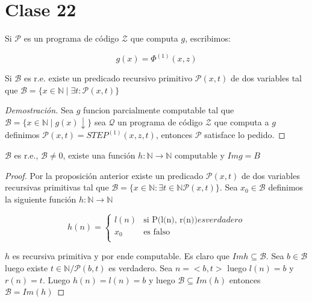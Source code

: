\section{Clase 22}

\begin{definition}
Si $\mathcal{P}$ es un programa de c\'odigo $\mathcal{Z}$ que computa $g$, escribimos:

\[
g(x) = \Phi^{(1)}(x, z)
\]
\end{definition}

\begin{proposition}
Si $\mathcal{B}$ es r.e. existe un predicado recursivo primitivo $\mathcal{P}(x, t)$ de dos variables tal que $\mathcal{B} = \{ x \in \mathbb{N} \mid \exists t \colon \mathcal{P}(x, t)\}$
\end{proposition}

\begin{proof}[Demostraci\'on]
Sea $g$ funcion parcialmente computable tal que $\mathcal{B} = \{ x \in \mathbb{N} \mid g(x) \downarrow \}$ sea $\mathcal{Q}$ un programa de c\'odigo $\mathcal{Z}$ que computa a $g$ definimos $\mathcal{P}(x, t) = STEP^{(1)}(x, z, t)$, entonces $\mathcal{P}$ satisface lo pedido.
\end{proof}

\begin{colorario}
$\mathcal{B}$ es r.e., $\mathcal{B} \neq 0$, existe una funci\'on $h \colon \mathbb{N} \to \mathbb{N}$ computable y $Img = B$
\end{colorario}

\begin{proof}
Por la proposici\'on anterior existe un predicado $\mathcal{P}(x, t)$ de dos variables recursivas primitivas tal que $\mathcal{B} = \{ x \in \mathbb{N} \colon \exists t \in \mathbb{N} \mathcal{P}(x, t)\}$. Sea $x_0 \in \mathcal{B}$  definimos la siguiente funci\'on $h \colon \mathbb{N} \to \mathbb{N}$

\[
h(n) =
\begin{cases}
l(n)				&\text{si P(l(n), r(n))} es verdadero			\\
x_0					&\text{es falso}								\\
\end{cases}
\]

$h$ es recursiva primitiva y por ende computable. Es claro que $Im h \subseteq \mathcal{B}$. Sea $b \in \mathcal{B}$ luego existe $t \in \mathbb{N} / \mathcal{P}(b, t)$ es verdadero. Sea $n = <b, t>$ luego $l(n) = b$ y $r(n) = t$. Luego $h(n) = l(n) = b$ y luego $\mathcal{B} \subseteq Im(h)$ entonces $\mathcal{B} = Im(h)$
\end{proof}

